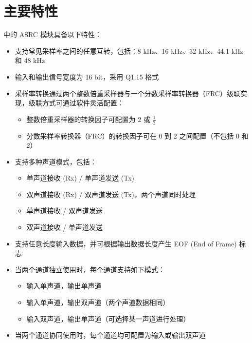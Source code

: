 \documentclass[main\_\_CN.tex]{subfiles}
\begin{document}

\section{主要特性}
\label{sec:asrc-features}

\chipname{} 中的 ASRC 模块具备以下特性：

\begin{itemize}
    \item 支持常见采样率之间的任意互转，包括：8 kHz、16 kHz、32 kHz、44.1 kHz 和 48 kHz
    \item 输入和输出信号宽度为 16 bit，采用 Q1.15 格式
    \item 采样率转换通过两个整数倍重采样器与一个分数采样率转换器（FRC）级联实现，级联方式可通过软件灵活配置：

    \begin{itemize}
      \item 整数倍重采样器的转换因子可配置为 2 或 $\frac{1}{2}$
      \item 分数采样率转换器（FRC）的转换因子可在 0 到 2 之间配置（不包括 0 和 2）
    \end{itemize}

    \item 支持多种声道模式，包括：
    \begin{itemize}
        \item 单声道接收 (Rx) / 单声道发送 (Tx)
        \item 双声道接收 (Rx) / 双声道发送 (Tx)，两个声道同时处理
        \item 单声道接收 / 双声道发送
        \item 双声道接收 / 单声道发送
    \end{itemize}
    \item 支持任意长度输入数据，并可根据输出数据长度产生 EOF (End of Frame) 标志
    \item 当两个通道独立使用时，每个通道支持如下模式：
    \begin{itemize}
        \item 输入单声道，输出单声道
        \item 输入单声道，输出双声道（两个声道数据相同）
        \item 输入双声道，输出单声道（可选择某一声道进行处理）
    \end{itemize}
    \item 当两个通道协同使用时，每个通道均可配置为输入或输出双声道
\end{itemize}
\end{document}
